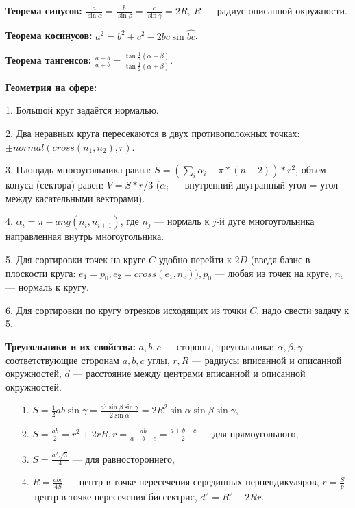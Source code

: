 \textbf{Теорема синусов:} $\frac{a}{\sin\alpha}=\frac{b}{\sin\beta}=\frac{c}{\sin\gamma}=2R,\ R$ --- радиус описанной окружности.

\textbf{Теорема косинусов:} $\displaystyle a^2 = b^2 + c^2 - 2bc\sin{\widehat{bc}}$.

\textbf{Теорема тангенсов:} $\displaystyle \frac{a-b}{a+b}=\frac{\tan\frac{1}{2}(\alpha -\beta)}{\tan\frac{1}{2}(\alpha +\beta)}$.

\textbf{Геометрия на сфере:}

1. Большой круг задаётся нормалью.

2. Два неравных круга пересекаются в двух противоположных точках: $\pm normal(cross(n_1, n_2), r)$.

3. Площадь многоугольника равна: $S = (\sum\limits_i\alpha_i - \pi * (n - 2)) * r^2$,
объем конуса (сектора) равен: $V = S * r / 3$ ($\alpha_i$ --- внутренний двугранный угол = угол между касательными векторами).

4. $\alpha_i = \pi - ang(n_i, n_{i + 1})$, где $n_j$ --- нормаль к $j$-й дуге многоугольника направленная внутрь многоугольника.

5. Для сортировки точек на круге $C$ удобно перейти к $2D$ (введя базис в плоскости круга:
$e_1 = p_0, e_2 = cross(e_1, n_c)), p_0$ --- любая из точек на круге, $n_c$ --- нормаль к кругу.

6. Для сортировки по кругу отрезков исходящих из точки $C$, надо свести задачу к 5.

\textbf{Треугольники и их свойства:}
$a, b, c$ --- стороны, треугольника;
$\alpha, \beta, \gamma$ --- соответствующие сторонам $a, b, c$ углы,
$r, R$ --- радиусы вписанной и описанной окружностей,
$d$ --- расстояние между центрами вписанной и описанной окружностей.

\begin{itemize}
    \item[$1.$] $S=\frac{1}{2}ab\sin\gamma=\frac{a^2\sin \beta\sin \gamma}{2\sin\alpha}=2R^2\sin\alpha\sin\beta\sin\gamma$,
	\item[$2.$] $S=\frac{ab}{2}=r^2+2rR, r = \frac{ab}{a + b + c} = \frac{a + b - c}2$ --- для прямоугольного,
	\item[$3.$] $S=\frac{a^2\sqrt 3}{4}$ --- для равностороннего,
    \item[$4.$] $R=\frac{abc}{4S}$ --- центр в точке пересечения серединных перпендикуляров,
	$r=\frac Sp$ --- центр в точке пересечения биссектрис, $d^2=R^2-2Rr$.
\end{itemize}


